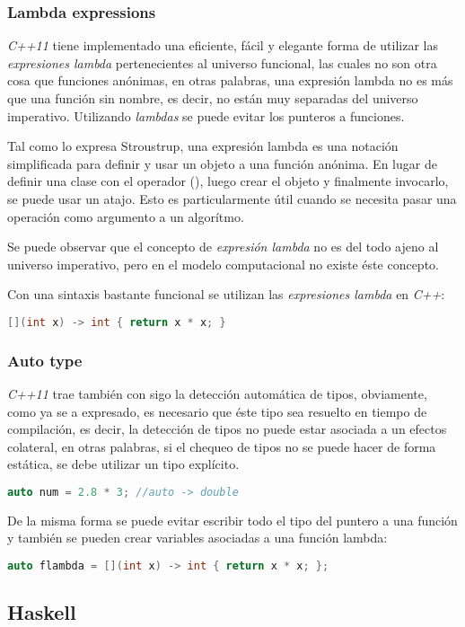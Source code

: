 	\subsubsection{Lambda expressions}
		\emph{C++11} tiene implementado una eficiente, fácil y elegante forma de utilizar las \emph{expresiones lambda} pertenecientes al universo funcional, las cuales no son otra cosa que funciones anónimas, en otras palabras, una expresión lambda no es más que una función sin nombre, es decir, no están muy separadas del universo imperativo. Utilizando \emph{lambdas} se puede evitar los punteros a funciones.
		
		Tal como lo expresa Stroustrup, una expresión lambda es una notación simplificada para definir y usar un objeto a una función anónima. En lugar de definir una clase con el operador (), luego crear el objeto y finalmente invocarlo, se puede usar un atajo. Esto es particularmente útil cuando se necesita pasar una operación como argumento a un algorítmo.\cite{Bjarne}
		
		Se puede observar que el concepto de \emph{expresión lambda} no es del todo ajeno al universo imperativo, pero en el modelo computacional no existe éste concepto.
		
		Con una sintaxis bastante funcional se utilizan las \emph{expresiones lambda} en \emph{C++}:
		
		\begin{lstlisting}[language=C++, caption="Lambda para elevar al cuadrado un número en C++"]
			[](int x) -> int { return x * x; }
		\end{lstlisting}
	
	\subsubsection{Auto type}
		\emph{C++11} trae también con sigo la detección automática de tipos, obviamente, como ya se a expresado, es necesario que éste tipo sea resuelto en tiempo de compilación, es decir, la detección de tipos no puede estar asociada a un efectos colateral, en otras palabras, si el chequeo de tipos no se puede hacer de forma estática, se debe utilizar un tipo explícito.
	
		\begin{lstlisting}[language=C++, caption="Auto type en C++"]
			auto num = 2.8 * 3; //auto -> double
		\end{lstlisting}
		
		De la misma forma se puede evitar escribir todo el tipo del puntero a una función y también se pueden crear variables asociadas a una función lambda:
		
		\begin{lstlisting}[language=C++, caption="Auto type en C++"]
		auto flambda = [](int x) -> int { return x * x; };
		\end{lstlisting}
				
	\subsection{Haskell}
	



